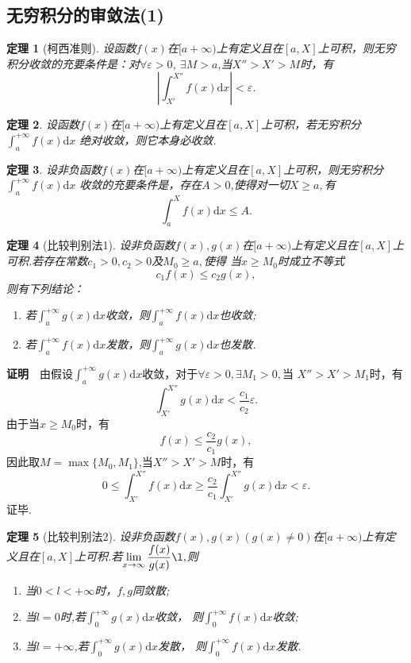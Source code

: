 \documentclass[UTF8]{article}
\newcommand{\dx}{\mathrm{d}x}
\newcommand{\zm}{\textbf{证明}$\quad$}
\newtheorem{thm}{\hspace{2em}定理}[section]
\begin{document}
\subsection{无穷积分的审敛法(1)}
\begin{thm}[柯西准则]
  设函数$f(x)$在$[a+\infty)$上有定义且在$[a,X]$上可积，则无穷积分收敛的充要条件是：对$\forall\varepsilon>0$,
  $\exists M>a$,当$X''>X'>M$时，有
  $$\left|\int_{X'}^{X''}f(x)\dx\right|<\varepsilon.$$
\end{thm}
\begin{thm}
  设函数$f(x)$在$[a+\infty)$上有定义且在$[a,X]$上可积，若无穷积分$\displaystyle\int_a^{+\infty}f(x)\dx$
  绝对收敛，则它本身必收敛.
\end{thm}
\begin{thm}
  设非负函数$f(x)$在$[a+\infty)$上有定义且在$[a,X]$上可积，则无穷积分$\displaystyle\int_a^{+\infty}f(x)\dx$
  收敛的充要条件是，存在$A>0$,使得对一切$X\ge a,$有
  $$\int_a^Xf(x)\dx\le A.$$
\end{thm}
\begin{thm}[比较判别法1]
  设非负函数$f(x),g(x)$在$[a+\infty)$上有定义且在$[a,X]$上可积.若存在常数$c_1>0,c_2>0$及$M_0\ge a,$使得
  当$x\ge M_0$时成立不等式
  $$c_1f(x)\le c_2g(x),$$则有下列结论：
  \begin{enumerate}
    \item 若$\displaystyle\int_a^{+\infty}g(x)\dx$收敛，则$\displaystyle\int_a^{+\infty}f(x)\dx$也收敛;
    \item 若$\displaystyle\int_a^{+\infty}f(x)\dx$发散，则$\displaystyle\int_a^{+\infty}g(x)\dx$也发散.
  \end{enumerate}
\end{thm}
\zm 由假设$\displaystyle\int_a^{+\infty}g(x)\dx$收敛，对于$\forall \varepsilon>0,\exists M_1>0,$当
$X''>X'>M_1$时，有
$$\int_{X'}^{X''}g(x)\dx<\frac{c_1}{c_2}\varepsilon.$$
由于当$x\ge M_0$时，有
$$f(x)\le \frac{c_2}{c_1}g(x),$$
因此取$M=\max\{M_0,M_1\}$,当$X''>X'>M$时，有
$$0\le\int_{X'}^{X''}f(x)\dx\ge\frac{c_2}{c_1}\int_{X'}^{X''}g(x)\dx<\varepsilon.$$证毕.\\
\begin{thm}[比较判别法2]
  设非负函数$f(x),g(x)(g(x)\ne0)$在$[a+\infty)$上有定义且在$[a,X]$上可积.若$\lim\limits_{x\to\infty}
  \dfrac{f(x)}{g(x)}\l,$则
  \begin{enumerate}
    \item 当$0<l<+\infty$时，$f,g$同敛散;
    \item 当$l=0$时,若$\displaystyle\int_0^{+\infty}g(x)\dx$收敛，
    则$\displaystyle\int_0^{+\infty}f(x)\dx$收敛;
    \item 当$l=+\infty$,若$\displaystyle\int_0^{+\infty}g(x)\dx$发散，
    则$\displaystyle\int_0^{+\infty}f(x)\dx$发散.
  \end{enumerate}
\end{thm}
\clearpage
\end{document}
